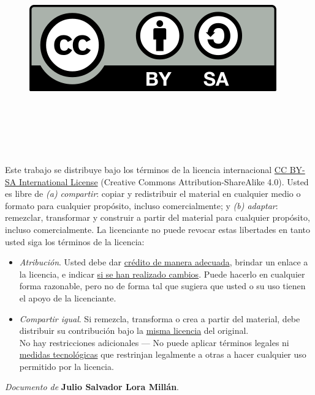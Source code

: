 
\cleardoublepage

\begin{flushright}
\begin{figure}
 \ \ \ \ \includegraphics[width=0.25\linewidth,right]{figs/by-sa.png}
 \label{fig:cc} 
 \end{figure}
\end{flushright}

\

\

\

\noindent
Este trabajo se distribuye bajo los términos de la licencia internacional \href{http://creativecommons.org/licenses/by-sa/4.0/}{CC BY-SA International License} (Creative Commons Attribution-ShareAlike 4.0). Usted es libre de \textit{(a) compartir}: copiar y redistribuir el material en cualquier medio o formato para cualquier propósito, incluso comercialmente; y \textit{(b) adaptar}: remezclar, transformar y construir a partir del material para cualquier propósito, incluso comercialmente. La licenciante no puede revocar estas libertades en tanto usted siga los términos de la licencia:

\begin{itemize}
\item \textit{Atribución}. Usted debe dar \href{https://creativecommons.org/licenses/by-sa/4.0/deed.es#ref-appropriate-credit}{crédito de manera adecuada}, brindar un enlace a la licencia, e indicar \href{https://creativecommons.org/licenses/by-sa/4.0/deed.es#ref-indicate-changes}{si se han realizado cambios}. Puede hacerlo en cualquier forma razonable, pero no de forma tal que sugiera que usted o su uso tienen el apoyo de la licenciante.
\item \textit{Compartir igual}. Si remezcla, transforma o crea a partir del material, debe distribuir su contribución bajo la \href{https://creativecommons.org/licenses/by-sa/4.0/deed.es#ref-same-license}{misma licencia} del original.\\
No hay restricciones adicionales — No puede aplicar términos legales ni \href{https://creativecommons.org/licenses/by-sa/4.0/deed.es#ref-technological-measures}{medidas tecnológicas} que restrinjan legalmente a otras a hacer cualquier uso permitido por la licencia.
\end{itemize}

\begin{flushright}
		\vspace{7.0 cm}
		\emph{Documento de} \textbf{Julio Salvador Lora Millán}. %
\end{flushright}

